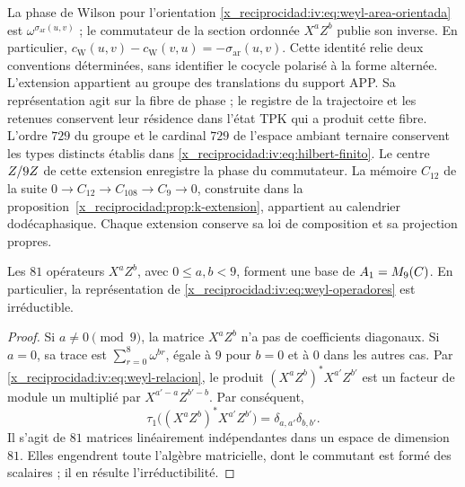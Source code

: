 La phase de Wilson pour l’orientation
\eqref{x_reciprocidad:iv:eq:weyl-area-orientada} est
\(\omega^{\sigma_{\mathrm{ar}}(u,v)}\) ; le commutateur de la
section ordonnée \(X^aZ^b\) publie son inverse. En particulier,
\(c_{\mathrm W}(u,v)-c_{\mathrm W}(v,u)
=-\sigma_{\mathrm{ar}}(u,v)\).
Cette identité relie deux conventions déterminées, sans identifier
le cocycle polarisé à la forme alternée. L’extension appartient
au groupe des translations du support APP. Sa représentation agit sur
la fibre de phase ; le registre de la trajectoire et les retenues conservent
leur résidence dans l’état TPK qui a produit cette fibre. L’ordre \(729\)
du groupe et le cardinal \(729\) de l’espace ambiant ternaire conservent les
types distincts établis dans \eqref{x_reciprocidad:iv:eq:hilbert-finito}.
Le centre \(Z/9Z\) de cette extension enregistre la phase
du commutateur. La mémoire \(C_{12}\) de la suite
\(0\to C_{12}\to C_{108}\to C_9\to0\), construite dans la
proposition~\ref{x_reciprocidad:prop:k-extension}, appartient au calendrier
dodécaphasique. Chaque extension conserve sa loi de composition et
sa projection propres.

\begin{proposition}
\label{x_reciprocidad:iv:prop:weyl-completo}
Les \(81\) opérateurs \(X^aZ^b\), avec \(0\leq a,b<9\), forment
une base de \(A_1=M_9(C)\). En particulier, la
représentation de \eqref{x_reciprocidad:iv:eq:weyl-operadores} est irréductible.
\end{proposition}
\begin{proof}
Si \(a\neq0\pmod9\), la matrice \(X^aZ^b\) n’a pas de coefficients
diagonaux. Si \(a=0\), sa trace est
\(\sum_{r=0}^8\omega^{br}\), égale à \(9\) pour \(b=0\) et à
\(0\) dans les autres cas. Par \eqref{x_reciprocidad:iv:eq:weyl-relacion}, le
produit \((X^aZ^b)^*X^{a'}Z^{b'}\) est un facteur de module un
multiplié par \(X^{a'-a}Z^{b'-b}\). Par conséquent,
\[
 \tau_1\bigl((X^aZ^b)^*X^{a'}Z^{b'}\bigr)
 =\delta_{a,a'}\delta_{b,b'}.
\]
Il s'agit de \(81\) matrices linéairement indépendantes dans un espace de dimension \(81\). Elles engendrent toute l'algèbre matricielle, dont le commutant est formé des scalaires ; il en résulte l'irréductibilité.
\end{proof}

